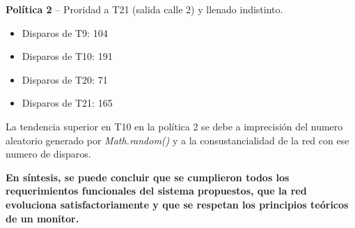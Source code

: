 \documentclass[12pt,a4paper]{article}
\begin{document}
\textbf{Política 2} -- Proridad a T21 (salida calle 2) y llenado indistinto.
\begin{itemize}[leftmargin=1.5cm]
    \item Disparos de T9: 104
    \item Disparos de T10: 191
    \item Disparos de T20: 71
    \item Disparos de T21: 165
\end{itemize}

La tendencia superior en T10 en la política 2 se debe a imprecisión del numero aleatorio generado por \textit{Math.random()} y a la consustancialidad de la red con ese numero de disparos.

\textbf{En síntesis, se puede concluir que se cumplieron todos los requerimientos funcionales del sistema propuestos, que la red evoluciona satisfactoriamente y que se respetan los principios teóricos de un monitor.}
\end{document}
